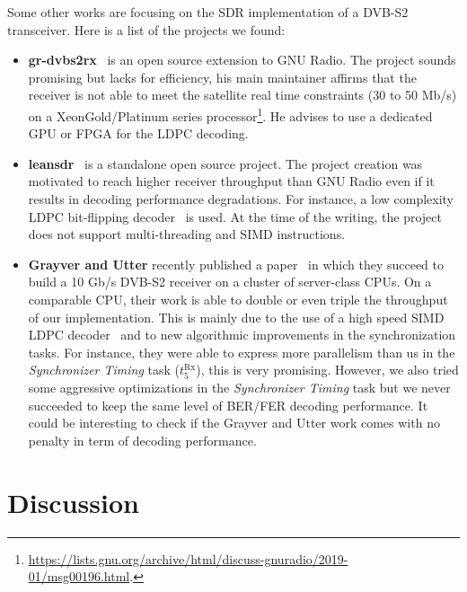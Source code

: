 Some other works are focusing on the SDR implementation of a DVB-S2 transceiver.
Here is a list of the projects we found:
\begin{itemize}
  \item \textbf{gr-dvbs2rx}~\cite{gr-dvbs2rx} is an open source extension to GNU
    Radio. The project sounds promising but lacks for efficiency, his main
    maintainer affirms that the receiver is not able to meet the satellite real
    time constraints (30 to 50 Mb/s) on a Xeon\TM Gold/Platinum series
    processor\footnote{\url{https://lists.gnu.org/archive/html/discuss-gnuradio/2019-01/msg00196.html}.}.
    He advises to use a dedicated GPU or FPGA for the LDPC decoding.
  \item \textbf{leansdr}~\cite{leansdr} is a standalone open source project. The
    project creation was motivated to reach higher receiver throughput than GNU
    Radio even if it results in decoding performance degradations. For instance,
    a low complexity LDPC bit-flipping decoder~\cite{Ryan2009} is used. At the
    time of the writing, the project does not support multi-threading and SIMD
    instructions.
  \item \textbf{Grayver and Utter} recently published a paper~\cite{Grayver2020}
    in which they succeed to build a 10 Gb/s DVB-S2 receiver on a cluster of
    server-class CPUs. On a comparable CPU, their work is able to double or even
    triple the throughput of our implementation. This is mainly due to the use
    of a high speed SIMD LDPC decoder~\cite{LeGal2016,Grayver2019} and to new
    algorithmic improvements in the synchronization tasks. For instance, they
    were able to express more parallelism than us in the \emph{Synchronizer
    Timing} task ($t^\text{Rx}_{5}$), this is very promising. However, we also
    tried some aggressive optimizations in the \emph{Synchronizer Timing} task
    but we never succeeded to keep the same level of BER/FER decoding
    performance. It could be interesting to check if the Grayver and Utter work
    comes with no penalty in term of decoding performance.
\end{itemize}

\section{Discussion}


